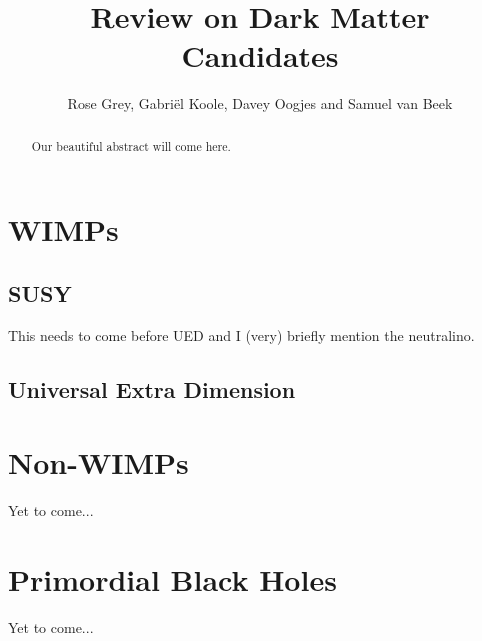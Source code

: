 \documentclass[a4paper]{article}
\title{Review on Dark Matter Candidates}
\author{Rose Grey, Gabri\"el Koole, Davey Oogjes and Samuel van Beek}
\begin{document}
\maketitle
\begin{abstract}
Our beautiful abstract will come here.
\end{abstract}













 
\newpage
\section{WIMPs}\label{3}

\subsection{SUSY}\label{3.1}
This needs to come before UED and I (very) briefly mention the neutralino.

\subsection{Universal Extra Dimension}\label{3.2}



\label{3.3}

\section{Non-WIMPs}\label{4}
Yet to come...
\section{Primordial Black Holes}\label{5}
Yet to come...




\newpage


\end{document}
